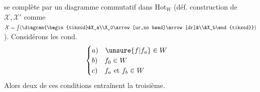se complète par un diagramme commutatif dans $\mathrm{Hot}_W$ (déf. construction de $\mathcal X,\mathcal X'$ comme $\mathcal X=\int(\diagram{\begin{tikzcd}&X_a\\X_0\arrow[ur,no head]\arrow[dr]&\\&X_b\end{tikzcd}})$). Considérons les cond.
\[\begin{cases}a)\quad\unsure{f|f_a}\in W\\b)\quad f_0\in W\\c)\quad f_a\text{ et }f_b\in W\end{cases}\]
Alors deux de ces conditions entraînent la troisième.

